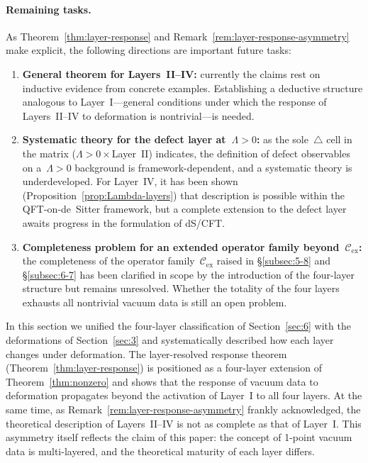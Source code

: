\documentclass[
  aps,
  prd,
  preprint,
  groupedaddress,
  nofootinbib,
  longbibliography
]{revtex4-2}
\theoremstyle{remark}
\newcommand{\Cex}{\mathcal{C}_{\mathrm{ex}}}
\begin{document}
\paragraph{Remaining tasks.}
As Theorem~\ref{thm:layer-response} and
Remark~\ref{rem:layer-response-asymmetry} make explicit, the
following directions are important future tasks:
\begin{enumerate}
\item \textbf{General theorem for Layers~II--IV:}
  currently the claims rest on inductive evidence from concrete
  examples.
  Establishing a deductive structure analogous to Layer~I---general conditions under which the response of
  Layers~II--IV to deformation is nontrivial---is needed.
\item \textbf{Systematic theory for the defect layer
  at~$\Lambda>0$:}
  as the sole~$\triangle$ cell in the matrix
  ($\Lambda>0\times$Layer~II) indicates, the definition of defect
  observables on a~$\Lambda>0$ background is
  framework-dependent, and a systematic theory is underdeveloped.
  For Layer~IV, it has been shown
  (Proposition~\ref{prop:Lambda-layers}) that description is
  possible within the QFT-on-de~Sitter framework, but a complete
  extension to the defect layer awaits progress in the
  formulation of dS/CFT\@.
\item \textbf{Completeness problem for an extended operator
  family beyond~$\Cex$:}
  the completeness of the operator family~$\Cex$ raised in
  \S\ref{subsec:5-8} and \S\ref{subsec:6-7} has been clarified
  in scope by the introduction of the four-layer structure but
  remains unresolved.
  Whether the totality of the four layers exhausts all nontrivial
  vacuum data is still an open problem.
\end{enumerate}

In this section we unified the four-layer classification of
Section~\ref{sec:6} with the deformations of
Section~\ref{sec:3} and systematically described how each layer
changes under deformation.
The layer-resolved response theorem
(Theorem~\ref{thm:layer-response}) is positioned as a four-layer
extension of Theorem~\ref{thm:nonzero} and shows that the
response of vacuum data to deformation propagates beyond the
activation of Layer~I to all four layers.
At the same time, as Remark~\ref{rem:layer-response-asymmetry}
frankly acknowledged, the theoretical description of
Layers~II--IV is not as complete as that of Layer~I\@.
This asymmetry itself reflects the claim of this paper:
the concept of 1-point vacuum data is multi-layered, and
the theoretical maturity of each layer differs.
\end{document}
